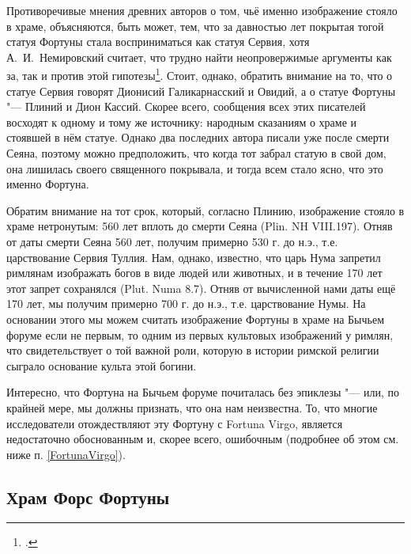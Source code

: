 Противоречивые мнения древних авторов о том, чьё именно изображение стояло в храме, объясняются, быть может, тем, что за давностью лет покрытая тогой статуя Фортуны стала восприниматься как статуя Сервия, хотя А.~И.~Немировский считает, что трудно найти неопровержимые аргументы как за, так и против этой гипотезы\footcite[С. 72]{Nemirovsky1964}. Стоит, однако, обратить внимание на то, что о статуе Сервия говорят Дионисий Галикарнасский и Овидий, а о статуе Фортуны "--- Плиний и Дион Кассий. Скорее всего, сообщения всех этих писателей восходят к одному и тому же источнику: народным сказаниям о храме и стоявшей в нём статуе. Однако два последних автора писали уже после смерти Сеяна, поэтому можно предположить, что когда тот забрал статую в свой дом, она лишилась своего священного покрывала, и тогда всем стало ясно, что это именно Фортуна.

Обратим внимание на тот срок, который, согласно Плинию, изображение стояло в храме нетронутым: 560 лет вплоть до смерти Сеяна (Plin. NH VIII.197). Отняв от даты смерти Сеяна 560 лет, получим примерно 530 г. до н.э., т.е. царствование Сервия Туллия. Нам, однако, известно, что царь Нума запретил римлянам изображать богов в виде людей или животных, и в течение 170 лет этот запрет сохранялся (Plut. Numa 8.7). Отняв от вычисленной нами даты ещё 170 лет, мы получим примерно 700 г. до н.э., т.е. царствование Нумы. На основании этого мы можем считать изображение Фортуны в храме на Бычьем форуме если не первым, то одним из первых культовых изображений у римлян, что свидетельствует о той важной роли, которую в истории римской религии сыграло основание культа этой богини.

Интересно, что Фортуна на Бычьем форуме почиталась без эпиклезы "--- или, по крайней мере, мы должны признать, что она нам неизвестна. То, что многие исследователи отождествляют эту Фортуну с Fortuna Virgo, является недостаточно обоснованным и, скорее всего, ошибочным (подробнее об этом см. ниже п. \ref{FortunaVirgo}).

\subsection{Храм Форс Фортуны}\label{FortisFortunae1}


